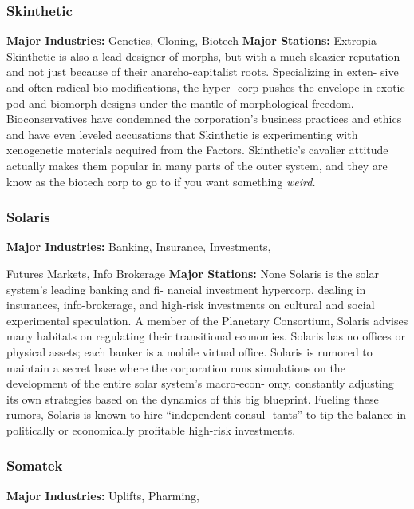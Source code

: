 \subsubsection{Skinthetic}

\textbf{Major Industries:} Genetics, Cloning, Biotech
\textbf{Major Stations:} Extropia
Skinthetic is also a lead designer of morphs, but with 
a much sleazier reputation and not just because of 
their anarcho-capitalist roots. Specializing in exten-
sive and often radical bio-modifications, the hyper-
corp pushes the envelope in exotic pod and biomorph 
designs under the mantle of morphological freedom. 
Bioconservatives have condemned the corporation's 
business practices and ethics and have even leveled 
accusations that Skinthetic is experimenting with 
xenogenetic materials acquired from the Factors. 
Skinthetic's cavalier attitude actually makes them 
popular in many parts of the outer system, and they 
are know as the biotech corp to go to if you want 
something \textit{weird.}

\subsubsection{Solaris}

\textbf{Major Industries:} Banking, Insurance, Investments, 

Futures Markets, Info Brokerage
\textbf{Major Stations:} None
Solaris is the solar system's leading banking and fi-
nancial investment hypercorp, dealing in insurances, 
info-brokerage, and high-risk investments on cultural 
and social experimental speculation. A member of the 
Planetary Consortium, Solaris advises many habitats 
on regulating their transitional economies. Solaris has 
no offices or physical assets; each banker is a mobile 
virtual office. Solaris is rumored to maintain a secret 
base where the corporation runs simulations on the 
development of the entire solar system's macro-econ-
omy, constantly adjusting its own strategies based 
on the dynamics of this big blueprint. Fueling these 
rumors, Solaris is known to hire ``independent consul-
tants'' to tip the balance in politically or economically 
profitable high-risk investments.

\subsubsection{Somatek}

\textbf{Major Industries:} Uplifts, Pharming, 


